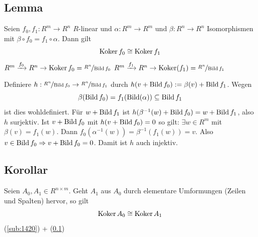 \subsection[Lemma über die Kokerne zweier $R$-linearen Abbildungen]{Lemma} %
\label{sub:1421}
Seien $f_0, f_1 : R^m \to R^n$ $R$-linear und $\alpha : R^m  \to R^m$ und $\beta : R^n \to R^n$ Isomorphismen mit $\beta \circ  f_0 = f_1 \circ \alpha$. Dann gilt
\[
	\operatorname{Koker} f_0 \cong \operatorname{Koker} f_1
\]
$R^m \xrightarrow{f_0} R^n \to \operatorname{Koker} f_0 = \nicefrac{R^n}{\operatorname{Bild} f_0} $ $R^m \xrightarrow{f_1} R^n \to \operatorname{Koker} (f_1) = \nicefrac{R^n}{\operatorname{Bild} f_1} $
\begin{figure}[h]
\end{figure}
Definiere $h : \nicefrac{R^n}{\operatorname{Bild} f_0} \to \nicefrac{R^n}{\operatorname{Bild} f_1}$ durch $h(v+ \operatorname{Bild} f_0) := \beta(v) + \operatorname{Bild} f_1$. Wegen 
\[
	\beta(\operatorname{Bild} f_0) = f_1 (\operatorname{Bild} (\alpha)) \subseteq \operatorname{Bild} f_1
\]
ist dies wohldefiniert. Für $w+ \operatorname{Bild} f_1$ ist $h ( \beta ^{-1} (w) + \operatorname{Bild} f_0) = w + \operatorname{Bild} f_1$, also $h$ surjektiv. Ist $v+ \operatorname{Bild} f_0$ mit $h(v+ \operatorname{Bild} f_0) = 0$
so gilt: $\exists w \in R^m$ mit $\beta(v)= f_1 (w)$. Dann $f_0 ( \alpha ^{-1} (w)) = \beta ^{-1} ( f_1 (w)) = v$. Also $v \in \operatorname{Bild} f_0 \Rightarrow v+ \operatorname{Bild} f_0 = 0$.
Damit ist $h$ auch injektiv. \bewende

\subsection[Korollar: Die Kokerne zweier Matrizen, die auseinander hervorgehen, sind isomorph]{Korollar} %
\label{sub:1422}
Seien $A_0, A_1 \in R^{n \times m}$. Geht $A_1$ aus $A_0$ durch elementare Umformungen (Zeilen und Spalten) hervor, so gilt 
\[
	\operatorname{Koker} A_0 \cong \operatorname{Koker} A_1
\]
(\ref{sub:1420}) + (\ref{sub:1421}) \bewende

